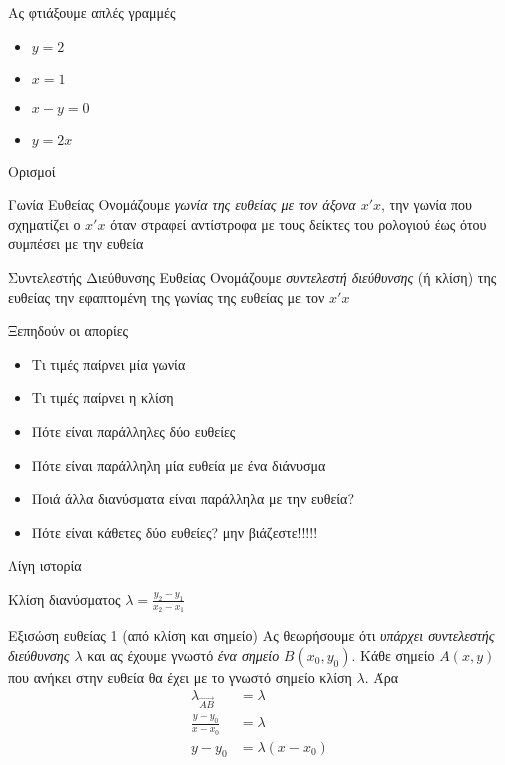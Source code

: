 \documentclass[greek]{beamer}
\begin{document}
\begin{frame}{Ας φτιάξουμε απλές γραμμές}
  \begin{itemize}[<+->]
    \item $y=2$
    \item $x=1$
    \item $x-y=0$
    \item $y=2x$
  \end{itemize}
\end{frame}

\begin{frame}{Ορισμοί}
  \begin{block}{Γωνία Ευθείας}
    Ονομάζουμε \emph{γωνία της ευθείας με τον άξονα $x'x$}, την γωνία που σχηματίζει ο $x'x$ όταν στραφεί αντίστροφα με τους δείκτες του ρολογιού έως ότου συμπέσει με την ευθεία
  \end{block}
  \begin{block}{Συντελεστής Διεύθυνσης Ευθείας}
    Ονομάζουμε \emph{συντελεστή διεύθυνσης} (ή κλίση) της ευθείας την εφαπτομένη της γωνίας της ευθείας με τον $x'x$
  \end{block}
\end{frame}

\begin{frame}{Ξεπηδούν οι απορίες}
  \begin{itemize}[<+->]
    \item Τι τιμές παίρνει μία γωνία
    \item Τι τιμές παίρνει η κλίση
    \item Πότε είναι παράλληλες δύο ευθείες
    \item Πότε είναι παράλληλη μία ευθεία με ένα διάνυσμα
    \item Ποιά άλλα διανύσματα είναι παράλληλα με την ευθεία?
    \item Πότε είναι κάθετες δύο ευθείες? μην βιάζεστε!!!!!
  \end{itemize}
\end{frame}

\begin{frame}{Λίγη ιστορία}
  \begin{block}{Κλίση διανύσματος}
    $λ=\frac{y_2-y_1}{x_2-x_1}$
  \end{block}
\end{frame}

\begin{frame}{Εξισώση ευθείας 1 (από κλίση και σημείο)}
  Ας θεωρήσουμε ότι \emph{υπάρχει συντελεστής διεύθυνσης $λ$} και ας έχουμε γνωστό \emph{ένα σημείο} $B(x_0,y_0)$. Κάθε σημείο $A(x,y)$ που ανήκει στην ευθεία θα έχει με το γνωστό σημείο κλίση $λ$. Άρα
  \begin{align*}
    λ_{\overrightarrow{AB}} & =λ        \\
    \frac{y-y_0}{x-x_0}     & =λ        \\
    y-y_0                   & =λ(x-x_0)
  \end{align*}
\end{frame}
\end{document}
